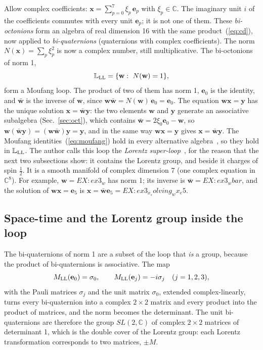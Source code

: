 \documentclass[aps,prd,twocolumn,superscriptaddress,nofootinbib,floatfix,longbibliography]{revtex4-2}
\newcommand{\LL}{{\rm LL}}
\newcommand{\e}[1]{\mathbf e_{#1}}
\begin{document}
Allow complex coefficients: $\mathbf x=\sum_{p=0}^7\xi_p\,\e p$ with $\xi_p\in\mathbb C$. The imaginary unit $i$ of the
coefficients commutes with every unit $\e p$; it is not one of them. These \emph{bi-octonions} form an algebra of
real dimension 16 with the same product~(\ref{eq:cd}), now applied to \emph{bi-quaternions} (quaternions with complex
coefficients). The norm $N(\mathbf x)=\sum_p\xi_p^2$ is now a complex number, still multiplicative. The bi-octonions of
norm 1,
\begin{equation}
\mathbb L_\LL=\{\mathbf w:\ N(\mathbf w)=1\},
\label{eq:loop}
\end{equation}
form a Moufang loop. The product of two of them has norm 1, $\e0$ is the identity, and $\bar{\mathbf w}$ is the inverse
of $\mathbf w$, since $\mathbf w\bar{\mathbf w}=N(\mathbf w)\,\e0=\e0$. The equation $\mathbf w\mathbf x=\mathbf y$ has the
unique solution $\mathbf x=\bar{\mathbf w}\mathbf y$: the two elements $\mathbf w$ and $\mathbf y$ generate an associative
subalgebra (Sec.~\ref{sec:oct}), which contains $\bar{\mathbf w}=2\xi_0\e0-\mathbf w$, so $\mathbf w(\bar{\mathbf
w}\mathbf y)=(\mathbf w\bar{\mathbf w})\mathbf y=\mathbf y$, and in the same way $\mathbf w\mathbf x=\mathbf y$ gives
$\mathbf x=\bar{\mathbf w}\mathbf y$. The Moufang identities~(\ref{eq:moufang}) hold in every alternative
algebra~\cite{Schafer1966}, so they hold in $\mathbb L_\LL$. The author calls this loop the \emph{Lorentz
super-loop}~\cite{Nash2026}, for the reason that the next two subsections show: it contains the Lorentz group, and beside
it charges of spin $\frac12$. It is a smooth manifold of complex dimension 7 (one complex equation in $\mathbb C^8$). For
example, $\mathbf w={{EX:ex3_w}}$ has norm 1; its inverse is $\bar{\mathbf
w}={{EX:ex3_wbar}}$, and the solution of $\mathbf w\mathbf x=\e5$ is $\mathbf x=\bar{\mathbf w}\e5={{EX:ex3_x_solving_wx_e5}}$.

\subsection{Space-time and the Lorentz group inside the loop}
\label{sec:lorentz}

The bi-quaternions of norm 1 are a subset of the loop that \emph{is} a group, because the product of bi-quaternions is
associative. The map
\begin{equation}
M_\LL(\e0)=\sigma_0,\qquad M_\LL(\e j)=-i\sigma_j\quad(j=1,2,3),
\label{eq:Mmap}
\end{equation}
with the Pauli matrices $\sigma_j$ and the unit matrix $\sigma_0$, extended complex-linearly, turns every bi-quaternion
into a complex $2\times2$ matrix and every product into the product of matrices, and the norm becomes the determinant.
The unit bi-quaternions are therefore the group $SL(2,\mathbb C)$ of complex $2\times2$ matrices of determinant 1, which is
the double cover of the Lorentz group: each Lorentz transformation corresponds to two matrices, $\pm M$.
\end{document}
